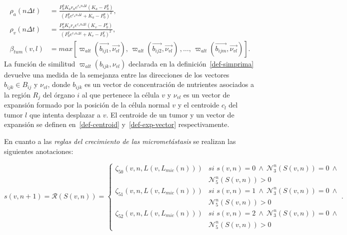 \begin{align*}
\rho_a(n\Delta t)& = \displaystyle\frac{P_0^a K_a r_a e^{r_a n\Delta t}(K_a-P_0^a)}{(P_0^a e^{r_a n\Delta t} + K_a - P_0^a)^2}, \\
\rho_v(n\Delta t)& = \displaystyle\frac{P_0^v K_v r_v e^{r_v n\Delta t}(K_v-P_0^v)}{(P_0^v e^{r_v n\Delta t} + K_v - P_0^v)^2}, \\
\beta_{tum}(v,l)& = max\left[\varpi_{alt}(\overrightarrow{b_{ij1}},\overrightarrow{\nu_{vl}}),\,\varpi_{alt}(\overrightarrow{b_{ij2}}, \overrightarrow{\nu_{vl}})\,,\ldots,\,\varpi_{alt}(\overrightarrow{b_{ijm}}, \overrightarrow{\nu_{vl}})\right].
\end{align*}
La funci\'on de similitud $\varpi_{alt}(b_{ijk},\nu_{vl})$ declarada en la definici\'on~\ref{def-simprima} devuelve una medida de la semejanza entre las direcciones de los vectores $b_{ijk} \in B_{ij}$ y $\nu_{vl}$, donde $b_{ijk}$ es un vector de concentraci\'on de nutrientes asociados a la regi\'on $R_j$ del \'organo $i$ al que pertenece la c\'elula $v$ y $\nu_{vl}$ es un vector de expansi\'on formado por la posici\'on de la c\'elula normal $v$ y el centroide $c_l$ del tumor $l$ que intenta desplazar a $v$. El centroide de un tumor y un vector de expansi\'on se definen en~\ref{def-centroid} y~\ref{def-exp-vector} respectivamente.\vspace*{0.5cm}

En cuanto a las \emph{reglas del crecimiento de las micromet\'astasis} se realizan las siguientes anotaciones:\label{NOT-crecimiento-micrometastasis}

\begin{equation*}
s(v,n+1)=\mathcal{R}(S(v,n))=\left\lbrace
	\begin{array}{ll}
		\zeta_{50}(v,n,L(v,L_{mic}(n))) & \textit{si } s(v,n)=0~\wedge~\mathcal{N}_3^n(S(v,n))=0~\wedge\\
								        & \mathcal{N}_5^n(S(v,n)) > 0 \\
		\zeta_{51}(v,n,L(v,L_{mic}(n))) & \textit{si } s(v,n)=1~\wedge~\mathcal{N}_3^n(S(v,n))=0~\wedge \\
								        & \mathcal{N}_5^n(S(v,n)) > 0 \\
		\zeta_{52}(v,n,L(v,L_{mic}(n))) & \textit{si } s(v,n)=2~\wedge~\mathcal{N}_3^n(S(v,n))=0~\wedge\\
								        & \mathcal{N}_5^n(S(v,n)) > 0 
	\end{array}
\right..
\end{equation*}

